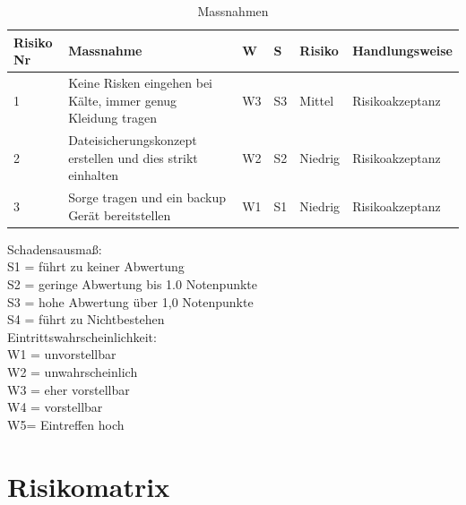 \documentclass{report}
\begin{document}
\bigbreak
\begin{table}[H]
    \begin{tabular}{ |C{0.1\textwidth}|C{0.3\textwidth}|C{0.1\textwidth}|C{0.1\textwidth}|C{0.1\textwidth}|C{0.2\textwidth}| }
        \hline
        Risiko Nr & Massnahme &  W & S & Risiko & Handlungsweise \\
         & Keine Risken eingehen bei Kälte, immer genug Kleidung tragen 
        & W3 & S3 & Mittel & Risikoakzeptanz \\
         & Dateisicherungskonzept erstellen und dies strikt einhalten 
        & W2 & S2 & Niedrig & Risikoakzeptanz \\
         & Sorge tragen und ein backup Gerät bereitstellen 
        & W1 & S1 & Niedrig & Risikoakzeptanz \\
        \hline
    \end{tabular}
    \caption{Massnahmen}
\end{table}
Schadensausmaß: \\
S1 = führt zu keiner Abwertung \\
S2 = geringe Abwertung bis 1.0 Notenpunkte \\
S3 = hohe Abwertung über 1,0 Notenpunkte \\
S4 = führt zu Nichtbestehen \\
\newline
Eintrittswahrscheinlichkeit: \\
W1 = unvorstellbar \\
W2 = unwahrscheinlich \\
W3 = eher vorstellbar \\
W4 = vorstellbar \\
W5= Eintreffen hoch \\

\section{Risikomatrix}
\end{document}
